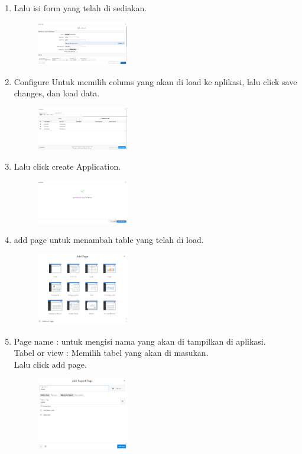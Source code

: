 \documentclass[a4paper,12pt]{report}
\begin{document}
\begin{enumerate}
\item
Lalu isi form yang telah di sediakan.
\begin{figure}[h]
\includegraphics[width=4cm]{gambar/16.png}
\end{figure}

\newpage
\item
Configure Untuk memilih colums yang akan di load ke aplikasi, lalu click save changes, dan load data.
\begin{figure}[h]
\includegraphics[width=4cm]{gambar/17.png}
\end{figure} 
 
\item
Lalu click create Application.
 \begin{figure}[h]
\includegraphics[width=4cm]{gambar/18.png}
\end{figure} 

\newpage
\item
add page untuk menambah table yang telah di load.
\begin{figure}[h]
\includegraphics[width=4cm]{gambar/19.png}
\end{figure}

\item 
Page name : untuk mengisi nama yang akan di tampilkan di aplikasi.\\
Tabel or view : Memilih tabel yang akan di masukan.\\
Lalu click add page. 
\begin{figure}[h]
\includegraphics[width=4cm]{gambar/20.png}
\end{figure} 


\end{enumerate}
\end{document}
